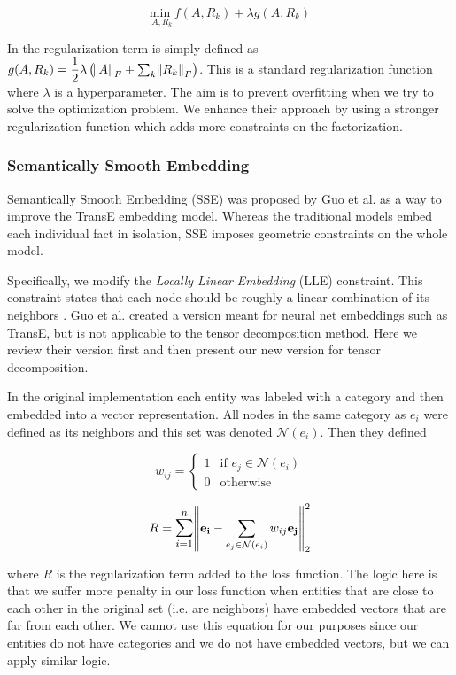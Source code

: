 \documentclass[pageno]{final_paper}
\begin{document}
\begin{equation}
    \label{eq: to minimize}
    \underset{A, R_k}{\text{min }} f(A,R_k) + \lambda g(A, R_k)
\end{equation}

In \cite{Nickel2011}\cite{Chang2014} the regularization term is simply defined
as $g(A, R_k) = \dfrac{1}{2}\lambda \left(\norm{A}_F + \sum_k \norm{R_k}_F\right)$. This is
a standard regularization function where $\lambda$ is a hyperparameter. The aim
is to prevent overfitting when we try to solve the optimization problem. We
enhance their approach by using a stronger regularization function which adds
more constraints on the factorization. \\

\subsubsection{Semantically Smooth Embedding}
\label{Semantically Smooth Embedding}

Semantically Smooth Embedding (SSE) was proposed by Guo et al. \cite{Guo2015} as
a way to improve the TransE \cite{Bordes2013} embedding model. Whereas the
traditional models embed each individual fact in isolation, SSE imposes
geometric constraints on the whole model.

Specifically, we modify the \textit{Locally Linear Embedding} (LLE) constraint.
This constraint states that each node should be roughly a linear combination of
its neighbors \cite{Roweis2000}. Guo et al. \cite{Guo2015} created a version
meant for neural net embeddings such as TransE, but is not applicable to the
tensor decomposition method. Here we review their version first and then present
our new version for tensor decomposition.

In the original implementation each entity was labeled with a category and
then embedded into a vector representation. All nodes in the same category as
$e_i$ were defined as its neighbors and this set was denoted $\mathcal{N}(e_i)$.
Then they defined

$$
w_{ij} =
\begin{cases}
    1 & \text{if } e_j \in \mathcal{N}(e_i) \\
    0 & \text{otherwise}
\end{cases}
$$

$$R = \mathlarger{\sum_{i=1}^n} \norm{\mathbf{e_i} - \sum_{e_j \in \mathcal{N}(e_i)} w_{ij}
\mathbf{e_j}}_2^2$$

where $R$ is the regularization term added to the loss function. The logic here
is that we suffer more penalty in our loss function when entities that are close
to each other in the original set (i.e. are neighbors) have embedded vectors
that are far from each other. We cannot use this equation for our purposes since
our entities do not have categories and we do not have embedded vectors, but we
can apply similar logic.
\end{document}
